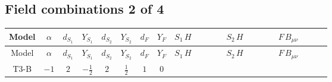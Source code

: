 \documentclass[8pt]{article}
\begin{document}
\begin{landscape}
\subsection*{Field combinations 2 of 4}
\begin{longtable}{@{}cccccccc >{\raggedright\arraybackslash}p{0.21\linewidth} >{\raggedright\arraybackslash}p{0.21\linewidth} >{\raggedright\arraybackslash}p{0.21\linewidth}@{}}
\toprule
Model & $\alpha$ & $d_{S_1}$ & $Y_{S_1}$ & $d_{S_2}$ & $Y_{S_2}$ & $d_F$ & $Y_F$ & $S_1\,H$ & $S_2\,H$ & $F\,B_{\mu\nu}$ \\
\midrule
\endfirsthead
\toprule
Model & $\alpha$ & $d_{S_1}$ & $Y_{S_1}$ & $d_{S_2}$ & $Y_{S_2}$ & $d_F$ & $Y_F$ & $S_1\,H$ & $S_2\,H$ & $F\,B_{\mu\nu}$ \\
\midrule
\endhead
T3-B & $-1$ & $2$ & $-\frac{1}{2}$ & $2$ & $\frac{1}{2}$ & $1$ & $0$ & \scriptsize\adjustbox{max width=\linewidth}{$\begin{gathered} +\frac{\hbar  H_{a_1} H_{a_2} H_{a_1}{}^{\dagger } H_{a_2}{}^{\dagger } \left(\lambda_{HS_1}^{(1)}^{(1)}\right){}^2}{2 \epsilon } \\ +\frac{1}{2} \hbar  \log \left(\frac{\bar{\mu}^{2}}{m_1^2}\right) H_{a_1} H_{a_2} H_{a_1}{}^{\dagger } H_{a_2}{}^{\dagger } \left(\lambda_{HS_1}^{(1)}^{(1)}\right){}^2 \\ +\frac{5 \hbar  H_{a_1} H_{a_2} H_{a_1}{}^{\dagger } H_{a_2}{}^{\dagger } \left(\lambda_{HS_1}^{(1)}^{(2)}\right){}^2}{6 \epsilon }\end{gathered}$} & \scriptsize\adjustbox{max width=\linewidth}{$\begin{gathered} +\frac{\hbar  H_{a_1} H_{a_2} H_{a_1}{}^{\dagger } H_{a_2}{}^{\dagger } \left(\lambda_{HS_2}^{(1)}^{(1)}\right){}^2}{2 \epsilon } \\ +\frac{1}{2} \hbar  \log \left(\frac{\bar{\mu}^{2}}{m_2^2}\right) H_{a_1} H_{a_2} H_{a_1}{}^{\dagger } H_{a_2}{}^{\dagger } \left(\lambda_{HS_2}^{(1)}^{(1)}\right){}^2 \\ +\frac{5 \hbar  H_{a_1} H_{a_2} H_{a_1}{}^{\dagger } H_{a_2}{}^{\dagger } \left(\lambda_{HS_2}^{(1)}^{(2)}\right){}^2}{6 \epsilon }\end{gathered}$} &  \\

\end{longtable}
\end{landscape}
\end{document}
